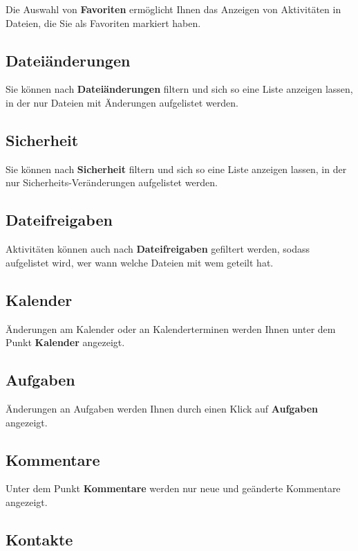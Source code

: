 \documentclass[
  letterpaper,
  DIV=11,
  numbers=noendperiod]{scrreprt}
\begin{document}
Die Auswahl von \textbf{Favoriten} ermöglicht Ihnen das Anzeigen von
Aktivitäten in Dateien, die Sie als Favoriten markiert haben.

\subsection{Dateiänderungen}\label{dateiuxe4nderungen}

Sie können nach \textbf{Dateiänderungen} filtern und sich so eine Liste
anzeigen lassen, in der nur Dateien mit Änderungen aufgelistet werden.

\subsection{Sicherheit}\label{sicherheit}

Sie können nach \textbf{Sicherheit} filtern und sich so eine Liste
anzeigen lassen, in der nur Sicherheits-Veränderungen aufgelistet
werden.

\subsection{Dateifreigaben}\label{dateifreigaben}

Aktivitäten können auch nach \textbf{Dateifreigaben} gefiltert werden,
sodass aufgelistet wird, wer wann welche Dateien mit wem geteilt hat.

\subsection{Kalender}\label{kalender-1}

Änderungen am Kalender oder an Kalenderterminen werden Ihnen unter dem
Punkt \textbf{Kalender} angezeigt.

\subsection{Aufgaben}\label{aufgaben}

Änderungen an Aufgaben werden Ihnen durch einen Klick auf
\textbf{Aufgaben} angezeigt.

\subsection{Kommentare}\label{kommentare}

Unter dem Punkt \textbf{Kommentare} werden nur neue und geänderte
Kommentare angezeigt.

\subsection{Kontakte}\label{kontakte-1}
\end{document}
